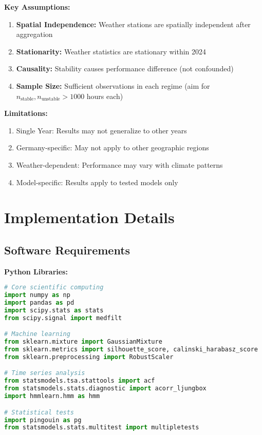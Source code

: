 \documentclass[11pt,a4paper]{article}
\begin{document}
\begin{mathbox}
\textbf{Key Assumptions:}

\begin{enumerate}
    \item \textbf{Spatial Independence:} Weather stations are spatially independent after aggregation
    \item \textbf{Stationarity:} Weather statistics are stationary within 2024
    \item \textbf{Causality:} Stability causes performance difference (not confounded)
    \item \textbf{Sample Size:} Sufficient observations in each regime (aim for $n_{\text{stable}}, n_{\text{unstable}} > 1000$ hours each)
\end{enumerate}

\textbf{Limitations:}
\begin{enumerate}
    \item Single Year: Results may not generalize to other years
    \item Germany-specific: May not apply to other geographic regions
    \item Weather-dependent: Performance may vary with climate patterns
    \item Model-specific: Results apply to tested models only
\end{enumerate}
\end{mathbox}

\section{Implementation Details}

\subsection{Software Requirements}

\textbf{Python Libraries:}
\begin{lstlisting}[language=Python]
# Core scientific computing
import numpy as np
import pandas as pd
import scipy.stats as stats
from scipy.signal import medfilt

# Machine learning
from sklearn.mixture import GaussianMixture
from sklearn.metrics import silhouette_score, calinski_harabasz_score
from sklearn.preprocessing import RobustScaler

# Time series analysis
from statsmodels.tsa.stattools import acf
from statsmodels.stats.diagnostic import acorr_ljungbox
import hmmlearn.hmm as hmm

# Statistical tests
import pingouin as pg
from statsmodels.stats.multitest import multipletests
\end{lstlisting}
\end{document}
